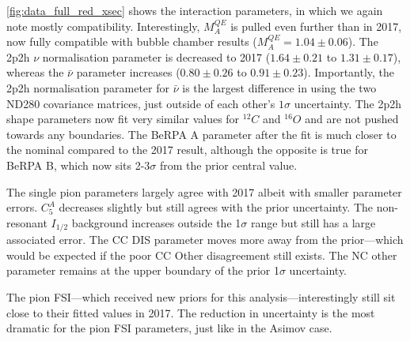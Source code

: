 \autoref{fig:data_full_red_xsec} shows the interaction parameters, in which we again note mostly compatibility. Interestingly, $M_A^{QE}$ is pulled even further than in 2017, now fully compatible with bubble chamber results ($M_A^{QE}=1.04\pm0.06$). The 2p2h $\nu$ normalisation parameter is decreased to 2017 ($1.64\pm0.21$ to $1.31\pm0.17$), whereas the $\bar{\nu}$ parameter increases ($0.80\pm0.26$ to $0.91\pm0.23$). Importantly, the 2p2h normalisation parameter for $\bar{\nu}$ is the largest difference in using the two ND280 covariance matrices, just outside of each other's $1\sigma$ uncertainty. The 2p2h shape parameters now fit very similar values for $^{12}C$ and $^{16}O$ and are not pushed towards any boundaries. The BeRPA A parameter after the fit is much closer to the nominal compared to the 2017 result, although the opposite is true for BeRPA B, which now sits 2-3$\sigma$ from the prior central value.

The single pion parameters largely agree with 2017 albeit with smaller parameter errors. $C_5^A$ decreases slightly but still agrees with the prior uncertainty. The non-resonant $I_{1/2}$ background increases outside the 1$\sigma$ range but still has a large associated error. The CC DIS parameter moves more away from the prior---which would be expected if the poor CC Other disagreement still exists. The NC other parameter remains at the upper boundary of the prior 1$\sigma$ uncertainty.

The pion FSI---which received new priors for this analysis---interestingly still sit close to their fitted values in 2017. The reduction in uncertainty is the most dramatic for the pion FSI parameters, just like in the Asimov case.

